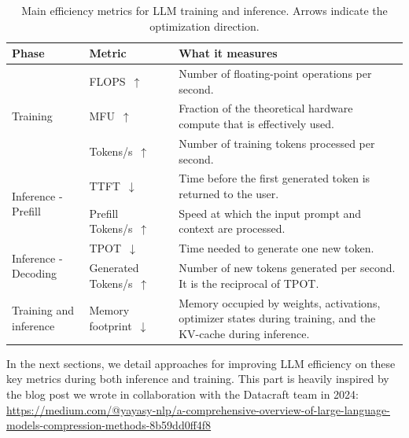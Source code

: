\begin{table}[h!]
    \centering
    \small
    \setlength{\tabcolsep}{6pt}
    \renewcommand{\arraystretch}{1.15}
    \begin{tabularx}{\textwidth}{@{} l l >{\raggedright\arraybackslash}X @{}}
        \toprule
        \textbf{Phase}
        & \textbf{Metric}
        & \textbf{What it measures} \\
        \midrule
        \multirow{3}{*}{Training}
        & FLOPS~$\uparrow$
        & Number of floating-point operations per second. \\
        \cmidrule(l){2-3}
        & MFU~$\uparrow$
        & Fraction of the theoretical hardware compute that is effectively used. \\
        \cmidrule(l){2-3}
        & Tokens/s~$\uparrow$
        & Number of training tokens processed per second. \\
        \midrule
        \multirow{2}{*}{Inference - Prefill}
        & TTFT~$\downarrow$
        & Time before the first generated token is returned to the user. \\
        \cmidrule(l){2-3}
        & Prefill Tokens/s~$\uparrow$
        & Speed at which the input prompt and context are processed. \\
        \midrule
        \multirow{2}{*}{Inference - Decoding}
        & TPOT~$\downarrow$
        & Time needed to generate one new token. \\
        \cmidrule(l){2-3}
        & Generated Tokens/s~$\uparrow$
        & Number of new tokens generated per second. It is the reciprocal of TPOT. \\
        \midrule
        Training and inference
        & Memory footprint~$\downarrow$
        & Memory occupied by weights, activations, optimizer states during training, and the KV-cache during inference. \\
        \bottomrule
    \end{tabularx}
    \caption{Main efficiency metrics for LLM training and inference. Arrows indicate the optimization direction.}
    \label{tab:efficiency-metrics}
\end{table}

In the next sections, we detail approaches for improving LLM efficiency on these key metrics
during both inference and training. This part is heavily inspired by the blog post we wrote in collaboration
with the Datacraft team in 2024: 
\url{https://medium.com/@yayasy-nlp/a-comprehensive-overview-of-large-language-models-compression-methods-8b59dd0ff4f8}

